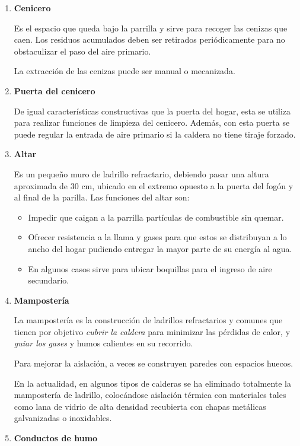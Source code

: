 \begin{enumerate}
	\item \textbf{Cenicero}
	
	Es el espacio que queda bajo la parrilla y sirve para recoger las cenizas que caen. Los residuos acumulados deben ser retirados periódicamente para no obstaculizar el paso del aire primario.
	
	
	La extracción de las cenizas puede ser manual o mecanizada.
	
	\item \textbf{Puerta del cenicero}
	
	De igual características constructivas que la puerta del hogar, esta se utiliza para realizar funciones de limpieza del cenicero. Además, con esta puerta se puede regular la entrada de aire primario si la caldera no tiene tiraje forzado.
	
	\item \textbf{Altar}
	
	Es un pequeño muro de ladrillo refractario, debiendo pasar una altura aproximada de 30 cm, ubicado en el extremo opuesto a la puerta del fogón y al final de la parilla. Las funciones del altar son:
	\begin{itemize}
		\item Impedir que caigan a la parrilla partículas de combustible sin quemar.
		\item Ofrecer resistencia a la llama y gases para que estos se distribuyan a lo ancho del hogar pudiendo entregar la mayor parte de su energía al agua.
		\item En algunos casos sirve para ubicar boquillas para el ingreso de aire secundario.
	\end{itemize}

	\item \textbf{Mampostería}
	
	La mampostería es la construcción de ladrillos refractarios y comunes que tienen por objetivo \textit{cubrir la caldera} para minimizar las pérdidas de calor, y \textit{guiar los gases} y humos calientes en su recorrido.
	
	
	Para mejorar la aislación, a veces se construyen paredes con espacios huecos.
	
	
	En la actualidad, en algunos tipos de calderas se ha eliminado totalmente la mampostería de ladrillo, colocándose aislación térmica con materiales tales como lana de vidrio de alta densidad recubierta con chapas metálicas galvanizadas o inoxidables.
	
	\item \textbf{Conductos de humo}
	

\end{enumerate}
